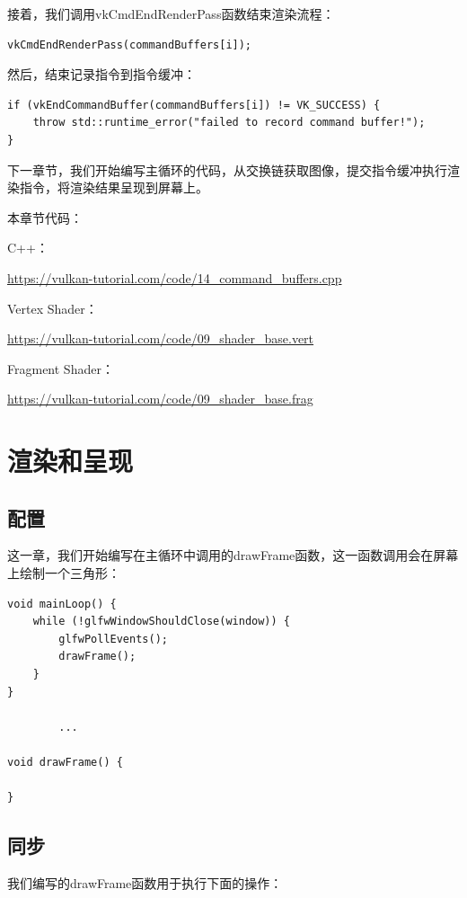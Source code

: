 \documentclass{ctexart}
\begin{document}
接着，我们调用vkCmdEndRenderPass函数结束渲染流程：

\begin{lstlisting}[language={[ANSI]C}]
vkCmdEndRenderPass(commandBuffers[i]);
\end{lstlisting}

然后，结束记录指令到指令缓冲：

\begin{lstlisting}[language={[ANSI]C}]
if (vkEndCommandBuffer(commandBuffers[i]) != VK_SUCCESS) {
	throw std::runtime_error("failed to record command buffer!");
}
\end{lstlisting}

下一章节，我们开始编写主循环的代码，从交换链获取图像，提交指令缓冲执行渲染指令，将渲染结果呈现到屏幕上。

本章节代码：

C++：

\url{https://vulkan-tutorial.com/code/14_command_buffers.cpp}

Vertex Shader：

\url{https://vulkan-tutorial.com/code/09_shader_base.vert}

Fragment Shader：

\url{https://vulkan-tutorial.com/code/09_shader_base.frag}

\newpage
\section{渲染和呈现}

\subsection{配置}

这一章，我们开始编写在主循环中调用的drawFrame函数，这一函数调用会在屏幕上绘制一个三角形：

\begin{lstlisting}[language={[ANSI]C}]
void mainLoop() {
	while (!glfwWindowShouldClose(window)) {
		glfwPollEvents();
		drawFrame();
	}
}

		...

void drawFrame() {

}
\end{lstlisting}

\subsection{同步}

我们编写的drawFrame函数用于执行下面的操作：
\end{document}
